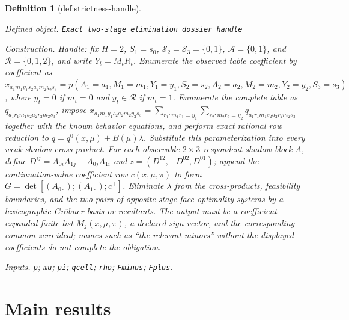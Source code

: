 \documentclass{article}
\newtheorem{definition}{Definition}
\begin{document}
\begin{definition}[def:strictness-handle]\label{def:strictness-handle}
\par\smallskip\noindent\emph{Defined object.} \texttt{Exact two-\allowbreak{}stage elimination dossier handle}
\par\smallskip\noindent\emph{Construction.} Handle: fix \(H=2\), \(S_1=s_0\), \(\mathcal S_2=\mathcal S_3=\{0,1\}\), \(\mathcal A=\{0,1\}\), and \(\mathcal R=\{0,1,2\}\), and write \(Y_t=M_tR_t\). Enumerate the observed table coefficient by coefficient as \(x_{a_1m_1y_1s_2a_2m_2y_2s_3}=p(A_1=a_1,M_1=m_1,Y_1=y_1,S_2=s_2,A_2=a_2,M_2=m_2,Y_2=y_2,S_3=s_3)\), where \(y_t=0\) if \(m_t=0\) and \(y_t\in\mathcal R\) if \(m_t=1\). Enumerate the complete table as \(q_{a_1r_1m_1s_2a_2r_2m_2s_3}\), impose \(x_{a_1m_1y_1s_2a_2m_2y_2s_3}=\sum_{r_1:m_1r_1=y_1}\sum_{r_2:m_2r_2=y_2}q_{a_1r_1m_1s_2a_2r_2m_2s_3}\) together with the known behavior equations, and perform exact rational row reduction to \(q=q^0(x,\mu)+B(\mu)\lambda\). Substitute this parameterization into every weak-shadow cross-product. For each observable \(2\times3\) respondent shadow block \(A\), define \(D^{ij}=A_{0i}A_{1j}-A_{0j}A_{1i}\) and \(z=(D^{12},-D^{02},D^{01})\); append the continuation-value coefficient row \(c(x,\mu,\pi)\) to form \(G=\det[(A_{0\cdot});(A_{1\cdot});c^\top]\). Eliminate \(\lambda\) from the cross-products, feasibility boundaries, and the two pairs of opposite stage-face optimality systems by a lexicographic Gröbner basis or resultants. The output must be a coefficient-expanded finite list \(M_j(x,\mu,\pi)\), a declared sign vector, and the corresponding common-zero ideal; names such as ``the relevant minors'' without the displayed coefficients do not complete the obligation.
\par\smallskip\noindent\emph{Inputs.} \texttt{p}; \texttt{mu}; \texttt{pi}; \texttt{qcell}; \texttt{rho}; \texttt{Fminus}; \texttt{Fplus}.
\end{definition}

\section{Main results}
\end{document}
